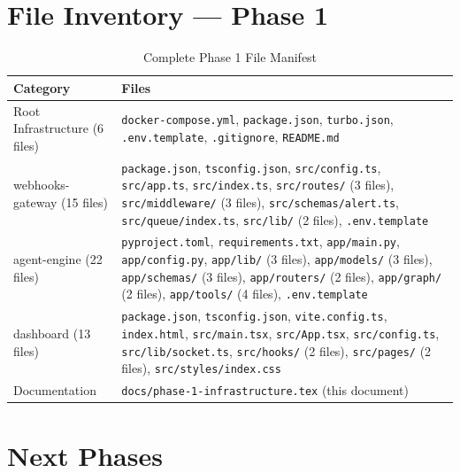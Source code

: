 \documentclass[11pt,a4paper]{article}
\begin{document}
\section{File Inventory — Phase 1}

\begin{table}[h!]
\centering
\caption{Complete Phase 1 File Manifest}
\renewcommand{\arraystretch}{1.2}
\begin{tabular}{p{5cm} p{8cm}}
\toprule
\textbf{Category} & \textbf{Files} \\
\midrule
Root Infrastructure (6 files) & \texttt{docker-compose.yml}, \texttt{package.json}, \texttt{turbo.json}, \texttt{.env.template}, \texttt{.gitignore}, \texttt{README.md} \\
\midrule
webhooks-gateway (15 files) & \texttt{package.json}, \texttt{tsconfig.json}, \texttt{src/config.ts}, \texttt{src/app.ts}, \texttt{src/index.ts}, \texttt{src/routes/} (3 files), \texttt{src/middleware/} (3 files), \texttt{src/schemas/alert.ts}, \texttt{src/queue/index.ts}, \texttt{src/lib/} (2 files), \texttt{.env.template} \\
\midrule
agent-engine (22 files) & \texttt{pyproject.toml}, \texttt{requirements.txt}, \texttt{app/main.py}, \texttt{app/config.py}, \texttt{app/lib/} (3 files), \texttt{app/models/} (3 files), \texttt{app/schemas/} (3 files), \texttt{app/routers/} (2 files), \texttt{app/graph/} (2 files), \texttt{app/tools/} (4 files), \texttt{.env.template} \\
\midrule
dashboard (13 files) & \texttt{package.json}, \texttt{tsconfig.json}, \texttt{vite.config.ts}, \texttt{index.html}, \texttt{src/main.tsx}, \texttt{src/App.tsx}, \texttt{src/config.ts}, \texttt{src/lib/socket.ts}, \texttt{src/hooks/} (2 files), \texttt{src/pages/} (2 files), \texttt{src/styles/index.css} \\
\midrule
Documentation & \texttt{docs/phase-1-infrastructure.tex} (this document) \\
\bottomrule
\end{tabular}
\end{table}

\section{Next Phases}
\end{document}
